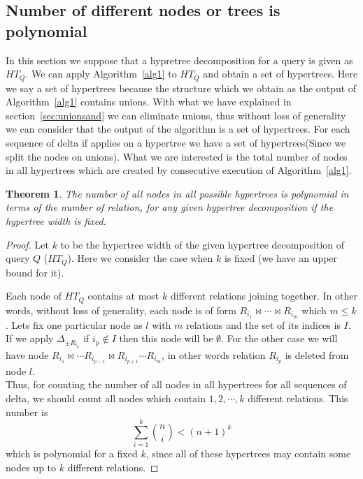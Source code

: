 \documentclass[12pt]{article}
\newtheorem{theorem}{Theorem}
\begin{document}
\subsection{Number of different nodes or trees is polynomial}
\label{sec:theorem1}
In this section we suppose that a hypretree decomposition for a query is given as $HT_{Q}$. We can apply Algorithm~\ref{alg1} to $HT_{Q}$ and obtain a set of hypertrees. Here we say a set of hypertrees because the structure which we obtain as the output of Algorithm~\ref{alg1} contains unions. With what we have explained in section~\ref{sec:unionsand} we can eliminate unions, thus without loss of generality we can consider that the output of the algorithm is a set of hypertrees. For each sequence of delta if applies on a hypertree we have a set of hypertrees(Since we split the nodes on unions). What we are interested is the total number of nodes in all hypertrees which are created by consecutive execution of Algorithm~\ref{alg1}.  
\begin{theorem}
\label{thm:1}
The number of all nodes in all possible hypertrees is polynomial in terms of the number of relation, for any given hypertree decomposition if the hypertree width is fixed. 
\end{theorem}
\begin{proof}
Let $k$ to be the hypertree width of the given hypertree decomposition of query $Q$ ($HT_{Q}$). Here we consider the case when $k$ is fixed (we have an upper bound for it).

Each node of $HT_{Q}$ contains at most $k$ different relations joining together. In other words, without loss of generality, each node is of form $R_{i_{1}}\Join\cdots\Join R_{i_{m}}$ which $m\leq k$. Lets fix one particular node as $l$ with $m$ relations and the set of its indices is $I$. If we apply $\Delta_{\pm R_{i_{p}}}$ if $i_{p}\not\in I$ then this node will be $\emptyset$. For the other case we will have node $R_{i_{1}}\Join\cdots R_{i_{p-1}}\Join R_{i_{p+1}}\cdots R_{i_{m}}$, in other words relation $R_{i_{p}}$ is deleted from node $l$.\\
Thus, for counting the number of all nodes in all hypertrees for all sequences of delta, we should count all nodes which contain $1,2,\cdots,k$ different relations. This number is 
\begin{equation}
\sum_{i=1}^{k}{\binom{n}{i}}<(n+1)^{k}
\end{equation}
which is polynomial for a fixed $k$, since all of these hypertrees may contain some nodes up to $k$ different relations. 
\end{proof}
\end{document}
